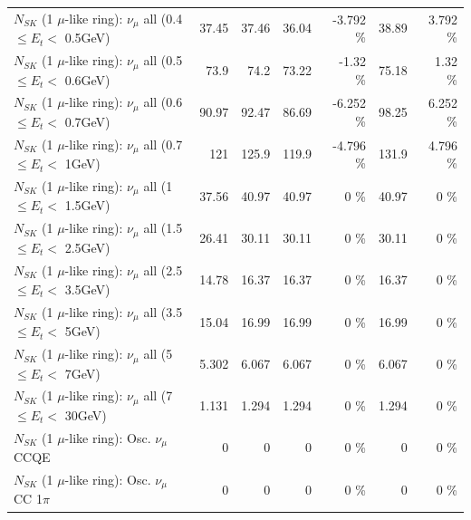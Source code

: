 \begin{table}
\begin{tabular}{| l | r | r | r  r | r  r |}
       $N_{SK}$ (1 $\mu$-like ring): $\nu_{\mu}$ all (0.4 $\leq E_{t} <$ 0.5GeV) &           37.45 &           37.46 &           36.04 &   -3.792 \%  &           38.89 &    3.792 \%  \\ 
       $N_{SK}$ (1 $\mu$-like ring): $\nu_{\mu}$ all (0.5 $\leq E_{t} <$ 0.6GeV) &            73.9 &            74.2 &           73.22 &    -1.32 \%  &           75.18 &     1.32 \%  \\ 
       $N_{SK}$ (1 $\mu$-like ring): $\nu_{\mu}$ all (0.6 $\leq E_{t} <$ 0.7GeV) &           90.97 &           92.47 &           86.69 &   -6.252 \%  &           98.25 &    6.252 \%  \\ 
         $N_{SK}$ (1 $\mu$-like ring): $\nu_{\mu}$ all (0.7 $\leq E_{t} <$ 1GeV) &             121 &           125.9 &           119.9 &   -4.796 \%  &           131.9 &    4.796 \%  \\ 
         $N_{SK}$ (1 $\mu$-like ring): $\nu_{\mu}$ all (1 $\leq E_{t} <$ 1.5GeV) &           37.56 &           40.97 &           40.97 &        0 \%  &           40.97 &        0 \%  \\ 
       $N_{SK}$ (1 $\mu$-like ring): $\nu_{\mu}$ all (1.5 $\leq E_{t} <$ 2.5GeV) &           26.41 &           30.11 &           30.11 &        0 \%  &           30.11 &        0 \%  \\ 
       $N_{SK}$ (1 $\mu$-like ring): $\nu_{\mu}$ all (2.5 $\leq E_{t} <$ 3.5GeV) &           14.78 &           16.37 &           16.37 &        0 \%  &           16.37 &        0 \%  \\ 
         $N_{SK}$ (1 $\mu$-like ring): $\nu_{\mu}$ all (3.5 $\leq E_{t} <$ 5GeV) &           15.04 &           16.99 &           16.99 &        0 \%  &           16.99 &        0 \%  \\ 
           $N_{SK}$ (1 $\mu$-like ring): $\nu_{\mu}$ all (5 $\leq E_{t} <$ 7GeV) &           5.302 &           6.067 &           6.067 &        0 \%  &           6.067 &        0 \%  \\ 
          $N_{SK}$ (1 $\mu$-like ring): $\nu_{\mu}$ all (7 $\leq E_{t} <$ 30GeV) &           1.131 &           1.294 &           1.294 &        0 \%  &           1.294 &        0 \%  \\ 
\hline
\hline
                               $N_{SK}$ (1 $\mu$-like ring): Osc. $\nu_\mu$ CCQE &               0 &               0 &               0 &        0 \%  &               0 &        0 \%  \\ 
                          $N_{SK}$ (1 $\mu$-like ring): Osc. $\nu_\mu$ CC 1$\pi$ &               0 &               0 &               0 &        0 \%  &               0 &        0 \%  \\ 

\end{tabular}
\end{table}
